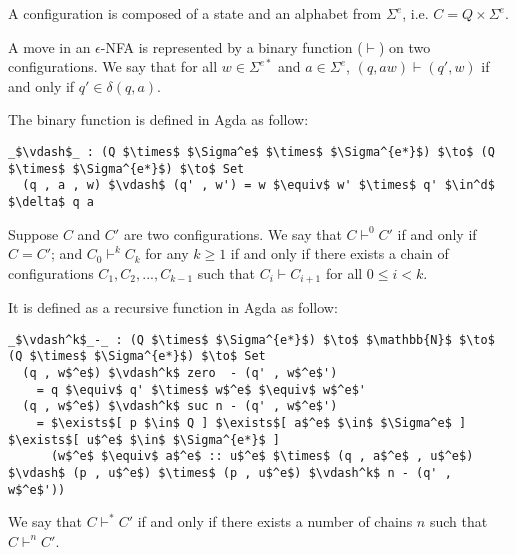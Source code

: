 \begin{defn}
\noindent A configuration is composed of a state and an alphabet from
\(\Sigma^e\), i.e. \(C = Q \times \Sigma^e\). 
\end{defn}

\begin{defn}
\noindent A move in an \(\epsilon\)-NFA is
represented by a binary function (\(\vdash\)) on two configurations. We say
that for all \(w \in \Sigma^{e*}\) and \(a \in \Sigma^e\), \((q, aw)
\vdash (q' , w)\) if and only if \(q' \in \delta (q , a)\). 
\end{defn}

\par The binary function is defined in Agda as follow: 
\begin{lstlisting}[mathescape=true,xleftmargin=.3\textwidth]
  _$\vdash$_ : (Q $\times$ $\Sigma^e$ $\times$ $\Sigma^{e*}$) $\to$ (Q $\times$ $\Sigma^{e*}$) $\to$ Set
  (q , a , w) $\vdash$ (q' , w') = w $\equiv$ w' $\times$ q' $\in^d$ $\delta$ q a
\end{lstlisting}

\begin{defn}
\noindent Suppose \(C\) and \(C'\) are two configurations. We say that \(C \vdash^0 C'\) if and only
if \(C = C'\); and \(C_0 \vdash^k C_k\) for any \(k \geq 1\) if and only if there exists a chain of
configurations \(C_1, C_2, ..., C_{k-1}\) such that \(C_i \vdash C_{i+1}\) for all \(0 \leq i < k\). 
\end{defn}

\par It is defined as a recursive function in Agda as follow: 
\begin{lstlisting}[mathescape=true,xleftmargin=.3\textwidth]
  _$\vdash^k$_-_ : (Q $\times$ $\Sigma^{e*}$) $\to$ $\mathbb{N}$ $\to$ (Q $\times$ $\Sigma^{e*}$) $\to$ Set
  (q , w$^e$) $\vdash^k$ zero  - (q' , w$^e$')
    = q $\equiv$ q' $\times$ w$^e$ $\equiv$ w$^e$'
  (q , w$^e$) $\vdash^k$ suc n - (q' , w$^e$') 
    = $\exists$[ p $\in$ Q ] $\exists$[ a$^e$ $\in$ $\Sigma^e$ ] $\exists$[ u$^e$ $\in$ $\Sigma^{e*}$ ]
      (w$^e$ $\equiv$ a$^e$ :: u$^e$ $\times$ (q , a$^e$ , u$^e$) $\vdash$ (p , u$^e$) $\times$ (p , u$^e$) $\vdash^k$ n - (q' , w$^e$'))
\end{lstlisting}

\begin{defn}
\noindent We say that \(C \vdash^* C'\) if and only
if there exists a number of chains \(n\) such that \(C \vdash^n C'\). 
\end{defn}

